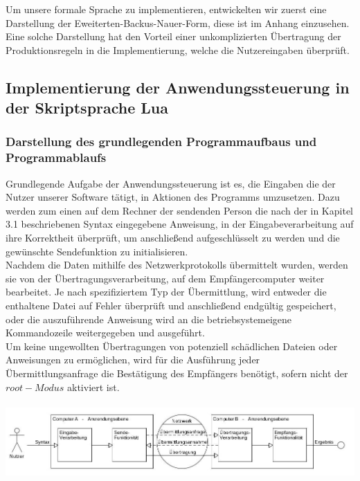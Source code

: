Um unsere formale Sprache zu implementieren, entwickelten wir zuerst eine Darstellung der Eweiterten-Backus-Nauer-Form, diese ist im Anhang einzusehen. Eine solche Darstellung hat den Vorteil einer unkomplizierten Übertragung der Produktionsregeln in die Implementierung, welche die Nutzereingaben überprüft.

\subsection{Implementierung der Anwendungssteuerung in der Skriptsprache Lua}

\subsubsection{Darstellung des grundlegenden Programmaufbaus und Programmablaufs}
Grundlegende Aufgabe der Anwendungssteuerung ist es, die Eingaben die der Nutzer unserer Software tätigt, in Aktionen des Programms umzusetzen. Dazu werden zum einen auf dem Rechner der sendenden Person die nach der in Kapitel 3.1 beschriebenen Syntax eingegebene Anweisung, in der Eingabeverarbeitung auf ihre Korrektheit überprüft, um anschließend aufgeschlüsselt zu werden und die gewünschte Sendefunktion zu initialisieren.\\
Nachdem die Daten mithilfe des Netzwerkprotokolls übermittelt wurden, werden sie von der Übertragungsverarbeitung, auf dem Empfängercomputer weiter bearbeitet. Je nach spezifiziertem Typ der Übermittlung, wird entweder die enthaltene Datei auf Fehler überprüft und anschließend endgültig gespeichert, oder die auszuführende Anweisung wird an die betriebsystemeigene Kommandozeile weitergegeben und ausgeführt.\\
Um keine ungewollten Übertragungen von potenziell schädlichen Dateien oder Anweisungen zu ermöglichen, wird für die Ausführung jeder Übermittlungsanfrage die Bestätigung des Empfängers benötigt, sofern nicht der $root-Modus$ aktiviert ist.\\\hfill\\
\includegraphics[scale=.45]{anw.jpg}
